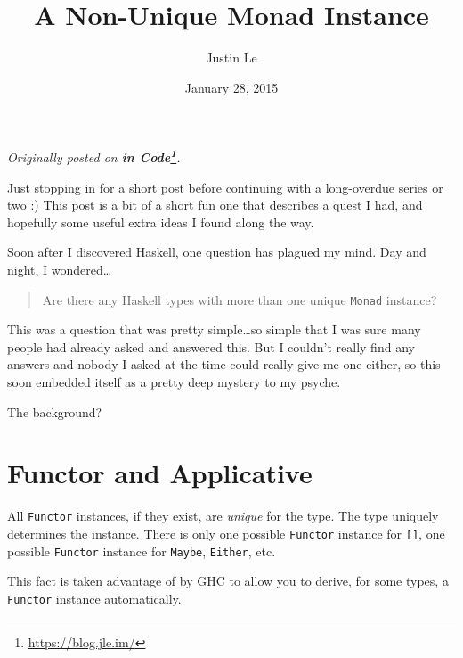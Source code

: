 \documentclass[]{article}
\title{A Non-Unique Monad Instance}
\author{Justin Le}
\date{January 28, 2015}
\renewcommand{\href}[2]{#2\footnote{\url{#1}}}
\begin{document}
\maketitle

\emph{Originally posted on \textbf{\href{https://blog.jle.im/}{in
Code}}.}

Just stopping in for a short post before continuing with a long-overdue
series or two :) This post is a bit of a short fun one that describes a
quest I had, and hopefully some useful extra ideas I found along the
way.

Soon after I discovered Haskell, one question has plagued my mind. Day
and night, I wondered\ldots{}

\begin{quote}
Are there any Haskell types with more than one unique \texttt{Monad}
instance?
\end{quote}

This was a question that was pretty simple\ldots{}so simple that I was
sure many people had already asked and answered this. But I couldn't
really find any answers and nobody I asked at the time could really give
me one either, so this soon embedded itself as a pretty deep mystery to
my psyche.

The background?

\section{Functor and Applicative}\label{functor-and-applicative}

All \texttt{Functor} instances, if they exist, are \emph{unique} for the
type. The type uniquely determines the instance. There is only one
possible \texttt{Functor} instance for \texttt{{[}{]}}, one possible
\texttt{Functor} instance for \texttt{Maybe}, \texttt{Either}, etc.

This fact is taken advantage of by GHC to allow you to derive, for some
types, a \texttt{Functor} instance automatically.
\end{document}
